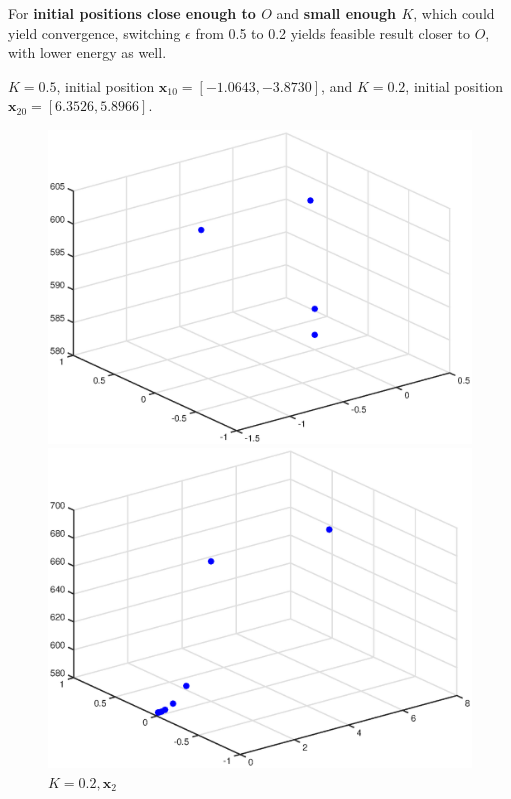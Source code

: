 \documentclass{article}
\begin{document}
\noindent
For \textbf{initial positions close enough to $O$} and \textbf{small enough $K$}, which could yield convergence, switching $\epsilon$ from 0.5 to 0.2 yields feasible result closer to $O$, with lower energy as well. 

\vspace{2mm}
$K=0.5$, initial position $\mathbf{x}_{10} = [-1.0643,-3.8730]$, and $K=0.2$, initial position $\mathbf{x}_{20} = [6.3526, 5.8966]$.


\begin{figure}[h]
\begin{minipage}[t]{0.5\linewidth}
\centering
\includegraphics[scale=0.4]{18}
\caption{$K=0.5,\mathbf{x}_1$}
\end{minipage}%
\begin{minipage}[t]{0.5\linewidth}
\centering
\includegraphics[scale=0.4]{19}
\caption{$K=0.2,\mathbf{x}_2$}
\end{minipage}
\end{figure}
\end{document}
